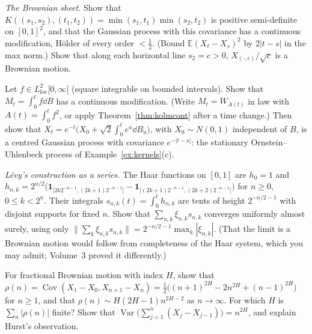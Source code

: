 \begin{exercise}[$\star\star$]\label{ex:sheet}
\emph{The Brownian sheet.} Show that $K((s_1,s_2),(t_1,t_2))=\min(s_1,t_1)\min(s_2,t_2)$ is positive semi-definite on $[0,1]^2$, and that the Gaussian process with this covariance has a continuous modification,
H\"older of every order $<\frac12$. (Bound $\mathbb E(X_t-X_s)^2$ by $2|t-s|$ in the max norm.) Show that along each horizontal line $s_2=c>0$, $X_{(\cdot,c)}/\sqrt c$ is a Brownian motion.
\end{exercise}

\begin{exercise}[$\star\star$]\label{ex:ou}
Let $f\in L^2_{\mathrm{loc}}[0,\infty[$ (square integrable on bounded intervals). Show that $M_t=\int_0^tf\dd B$ has a continuous modification. (Write $M_t=W_{A(t)}$ in law with $A(t)=\int_0^tf^2$, or apply
Theorem~\ref{thm:kolmcont} after a time change.) Then show that $X_t=e^{-t}\bigl(X_0+\sqrt2\int_0^te^u\dd B_u\bigr)$, with $X_0\sim N(0,1)$ independent of $B$, is a centred Gaussian process with covariance $e^{-|t-s|}$:
the stationary Ornstein--Uhlenbeck process of Example~\ref{ex:kernels}(c).
\end{exercise}

\begin{exercise}[$\star\star$]\label{ex:haar}
\emph{L\'evy's construction as a series.} The Haar functions on $[0,1]$ are $h_0=1$ and $h_{n,k}=2^{n/2}\bigl(\mathbf 1_{[2k2^{-n-1},(2k+1)2^{-n-1}[}-\mathbf 1_{[(2k+1)2^{-n-1},(2k+2)2^{-n-1}[}\bigr)$ for $n\ge0$, $0\le k<2^n$.
Their integrals $s_{n,k}(t)=\int_0^th_{n,k}$ are tents of height $2^{-n/2-1}$ with disjoint supports for fixed $n$. Show that $\sum_{n,k}\xi_{n,k}s_{n,k}$ converges uniformly almost surely, using only
$\|\sum_k\xi_{n,k}s_{n,k}\|=2^{-n/2-1}\max_k|\xi_{n,k}|$. (That the limit is a Brownian motion would follow from completeness of the Haar system, which you may admit; Volume~3 proved it differently.)
\end{exercise}

\begin{exercise}[$\star\star$]\label{ex:fbmcorr}
For fractional Brownian motion with index $H$, show that $\rho(n)=\operatorname{Cov}(X_1-X_0,X_{n+1}-X_n)=\frac12\bigl((n+1)^{2H}-2n^{2H}+(n-1)^{2H}\bigr)$ for $n\ge1$, and that $\rho(n)\sim H(2H-1)n^{2H-2}$ as $n\to\infty$. For
which $H$ is $\sum_n|\rho(n)|$ finite? Show that $\operatorname{Var}\bigl(\sum_{j=1}^n(X_j-X_{j-1})\bigr)=n^{2H}$, and explain Hurst's observation.
\end{exercise}

